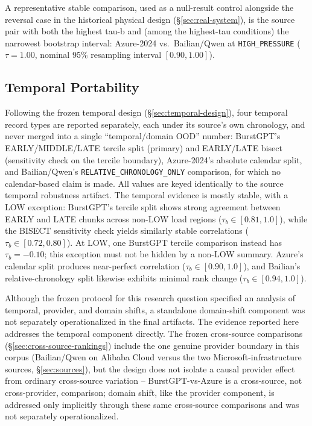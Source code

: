 A representative stable comparison, used as a null-result control alongside
the reversal case in the historical physical design
(\S\ref{sec:real-system}), is the source pair with both the highest tau-b
and (among the highest-tau conditions) the narrowest bootstrap interval:
Azure-2024 vs.\ Bailian/Qwen at \texttt{HIGH\_PRESSURE} ($\tau = 1.00$,
nominal 95\% resampling interval $[0.90, 1.00]$).

\subsection{Temporal Portability}
\label{sec:temporal}

Following the frozen temporal design (\S\ref{sec:temporal-design}), four
temporal record types are reported separately, each under its source's own
chronology, and never merged into a single ``temporal/domain OOD'' number:
BurstGPT's EARLY/MIDDLE/LATE tercile split (primary) and EARLY/LATE bisect
(sensitivity check on the tercile boundary), Azure-2024's absolute calendar
split, and Bailian/Qwen's \texttt{RELATIVE\_CHRONOLOGY\_ONLY} comparison,
for which no calendar-based claim is made. All values are keyed identically
to the source temporal robustness artifact. The temporal evidence is mostly stable, with a LOW exception: BurstGPT's tercile split shows strong agreement between EARLY and LATE chunks across non-LOW load regions ($\tau_b \in [0.81, 1.0]$), while the BISECT sensitivity check yields similarly stable correlations ($\tau_b \in [0.72, 0.80]$). At LOW, one BurstGPT tercile comparison instead has $\tau_b=-0.10$; this exception must not be hidden by a non-LOW summary. Azure's calendar split produces near-perfect correlation ($\tau_b \in [0.90, 1.0]$), and Bailian's relative-chronology split likewise exhibits minimal rank change ($\tau_b \in [0.94, 1.0]$).

Although the frozen protocol for this research question specified an analysis of temporal, provider, and domain shifts, a standalone domain-shift component was not separately operationalized in the final artifacts. The evidence reported here addresses the temporal component directly. The frozen cross-source comparisons (\S\ref{sec:cross-source-rankings}) include the one genuine provider boundary in this corpus (Bailian/Qwen on Alibaba Cloud versus the two Microsoft-infrastructure sources, \S\ref{sec:sources}), but the design does not isolate a causal provider effect from ordinary cross-source variation -- BurstGPT-vs-Azure is a cross-source, not cross-provider, comparison; domain shift, like the provider component, is addressed only implicitly through these same cross-source comparisons and was not separately operationalized.

